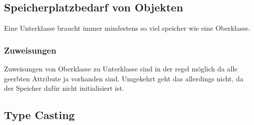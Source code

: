 

\subsection{Speicherplatzbedarf von Objekten}

Eine Unterklasse braucht immer mindestens so viel speicher wie eine Oberklasse.

\subsubsection{Zuweisungen}

Zuweisungen von Oberklasse zu Unterklasse sind in der regel möglich da alle geerbten Attribute ja vorhanden sind. 
Umgekehrt geht das allerdings nicht, da der Speicher dafür nicht initialisiert ist.

\subsection{Type Casting}


